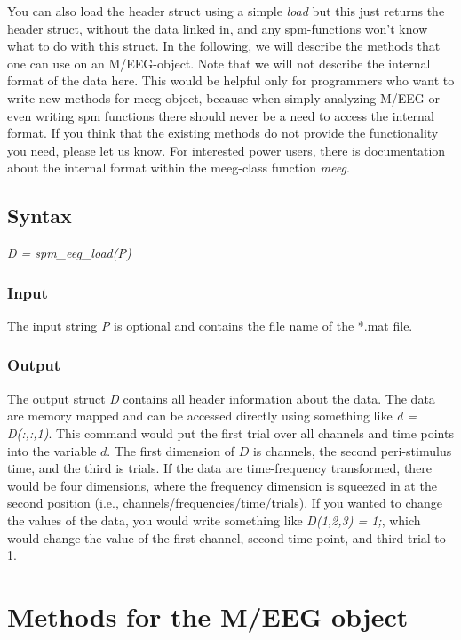 You can also load the header struct using a
simple \textit{load} but this just returns the header struct, without the
data linked in, and any spm-functions won't know what to do with this
struct.  In the following, we will describe the methods
that one can use on an M/EEG-object. Note that we will not describe
the internal format of the data here. This would be helpful only for
programmers who want to write new methods for meeg object, because when simply
analyzing M/EEG or even writing spm functions there should never be a need
to access the internal format. If you think that the existing methods do not
provide the functionality you need, please let us know. For interested power users,
there is documentation about the internal format within the meeg-class function 
\textit{meeg}. 

\subsection{Syntax}
\textit{D = spm\_eeg\_load(P)}
\\

\subsubsection{Input}
The input string {\textit P} is optional and contains the file name of the
*.mat file.

\subsubsection{Output}
The output struct {\textit D} contains all header information about the
data. The data are memory mapped and can be accessed directly using
something like \textit{d = D(:,:,1)}. This command would put the first
trial over all channels and time points into the variable $d$. The
first dimension of $D$ is channels, the second peri-stimulus time, and
the third is trials. If the data are time-frequency transformed, there
would be four dimensions, where the frequency dimension is squeezed in
at the second position (i.e., channels/frequencies/time/trials). If
you wanted to change the values of the data, you would write something
like \textit{D(1,2,3) = 1;}, which would change the value of the first
channel, second time-point, and third trial to 1.


\section{Methods for the M/EEG object}

